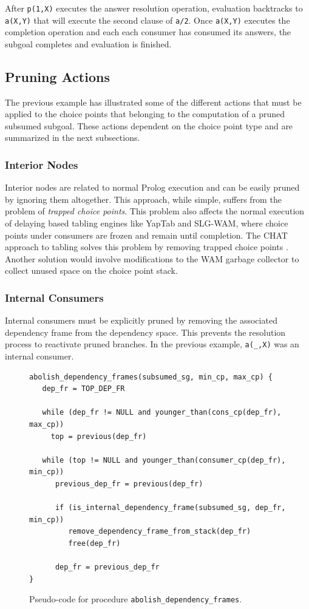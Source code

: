 After \texttt{p(1,X)} executes the answer resolution
operation, evaluation backtracks to \texttt{a(X,Y)} that will execute the second clause of \texttt{a/2}.
Once \texttt{a(X,Y)} executes the completion operation and each each consumer has consumed its answers,
the subgoal completes and evaluation is finished.

\subsection{Pruning Actions}

The previous example has illustrated some of the different actions that must be applied to the choice points that
belonging to the computation of a pruned subsumed subgoal. These actions dependent on the choice point
type and are summarized in the next subsections.

\subsubsection{Interior Nodes}

Interior nodes are related to normal Prolog execution and can be easily pruned
by ignoring them altogether. This approach, while simple, suffers from the problem of \textit{trapped
choice points}. This problem also affects the normal execution of delaying based tabling engines like
YapTab and SLG-WAM, where choice points under consumers are frozen and remain until completion.
The CHAT approach to tabling solves this problem by removing trapped choice points \cite{Demoen-99b}.
Another solution would involve modifications to the WAM garbage collector to collect unused space on
the choice point stack.

\subsubsection{Internal Consumers}   
   
Internal consumers must be explicitly pruned by removing the associated
dependency frame from the dependency space. This prevents the resolution process to reactivate pruned
branches. In the previous example, \texttt{a(\_,X)} was an internal consumer.

\begin{figure}[ht]
\begin{Verbatim}
abolish_dependency_frames(subsumed_sg, min_cp, max_cp) {
   dep_fr = TOP_DEP_FR
   
   while (dep_fr != NULL and younger_than(cons_cp(dep_fr), max_cp))
     top = previous(dep_fr)
     
   while (top != NULL and younger_than(consumer_cp(dep_fr), min_cp))
      previous_dep_fr = previous(dep_fr)

      if (is_internal_dependency_frame(subsumed_sg, dep_fr, min_cp))
         remove_dependency_frame_from_stack(dep_fr)
         free(dep_fr)
      
      dep_fr = previous_dep_fr
}
\end{Verbatim}
\caption{Pseudo-code for procedure \texttt{abolish\_dependency\_frames}.}
\label{fig:abolish_dependency_frames}
\end{figure}
   
